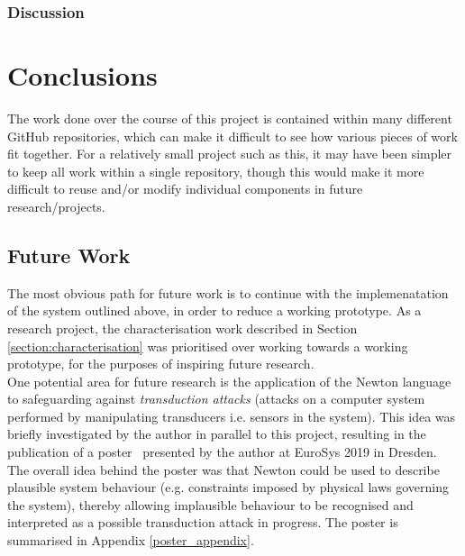 \documentclass[12pt]{article}
\begin{document}
    \subsubsection{Discussion}

\newpage



%
%

\section{Conclusions}

  The work done over the course of this project is contained within many different GitHub repositories, which can make it difficult to see how various pieces of work fit together. For a relatively small project such as this, it may have been simpler to keep all work within a single repository, though this would make it more difficult to reuse and/or modify individual components in future research/projects.

  \subsection{Future Work}
    The most obvious path for future work is to continue with the implemenatation of the system outlined above, in order to reduce a working prototype. As a research project, the characterisation work described in Section \ref{section:characterisation} was prioritised over working towards a working prototype, for the purposes of inspiring future research.\\

    One potential area for future research is the application of the Newton language to safeguarding against \textit{transduction attacks} (attacks on a computer system performed by manipulating transducers i.e. sensors in the system). This idea was briefly investigated by the author in parallel to this project, resulting in the publication of a poster~\cite{eurosys_poster} presented by the author at EuroSys 2019 in Dresden. The overall idea behind the poster was that Newton could be used to describe plausible system behaviour (e.g. constraints imposed by physical laws governing the system), thereby allowing implausible behaviour to be recognised and interpreted as a possible transduction attack in progress. The poster is summarised in Appendix \ref{poster_appendix}.


\newpage



\noindent
\end{document}
